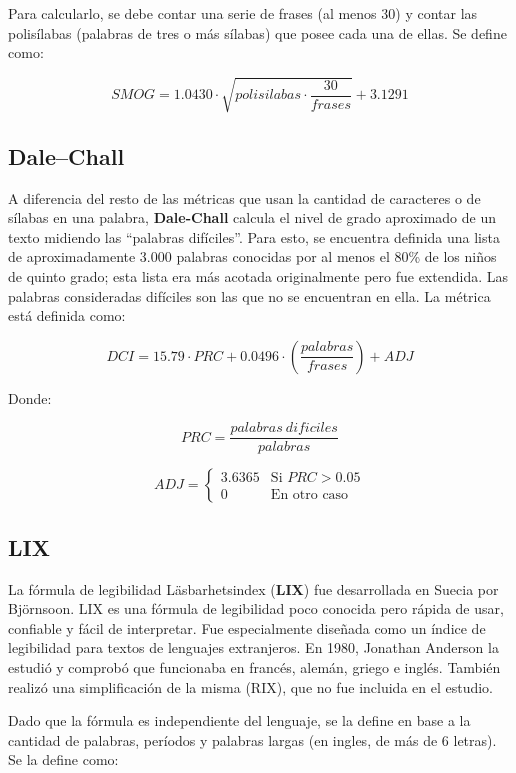\documentclass[12pt,journal,compsoc]{IEEEtran}
\begin{document}
Para calcularlo, se debe contar una serie de frases (al menos 30) y contar las polisílabas (palabras de tres o más sílabas) que posee cada una de ellas. Se define como: 

$$SMOG = 1.0430\cdot \sqrt{polisilabas \cdot \frac{30}{frases}} + 3.1291$$

\subsection{Dale–Chall}
A diferencia del resto de las métricas que usan la cantidad de caracteres o de sílabas en una palabra, \textbf{Dale-Chall}\cite{dale-chall} calcula el nivel de grado aproximado de un texto midiendo las ``palabras difíciles''. Para esto, se encuentra definida una lista de aproximadamente 3.000 palabras conocidas por al menos el 80\% de los niños de quinto grado; esta lista era más acotada originalmente pero fue extendida\cite{dale-chall-ex}. Las palabras consideradas difíciles son las que no se encuentran en ella. La métrica está definida como:

$$DCI = 15.79 \cdot PRC+0.0496\cdot \left({\frac{{palabras}}{{frases}}}\right) + ADJ$$

Donde:

$$ PRC = \frac{{palabras\ dificiles}}{{palabras}} $$

$$
ADJ =
\left\{
  \begin{array}{ll}
    3.6365 & \mbox{Si } PRC > 0.05 \\
    0 & \mbox{En otro caso}
  \end{array}
\right.
$$

\subsection{LIX}

La fórmula de legibilidad Läsbarhetsindex (\textbf{LIX})\cite{lix-rix} fue desarrollada en Suecia por Björnsoon. LIX es una fórmula de legibilidad poco conocida pero rápida de usar, confiable y fácil de interpretar. Fue especialmente diseñada como un índice de legibilidad para textos de lenguajes extranjeros. En 1980, Jonathan Anderson la estudió y comprobó que funcionaba en francés, alemán, griego e inglés. También realizó una simplificación de la misma (RIX), que no fue incluida en el estudio.

Dado que la fórmula es independiente del lenguaje, se la define en base a la cantidad de palabras, períodos y palabras largas (en ingles, de más de 6 letras). Se la define como:
\end{document}
